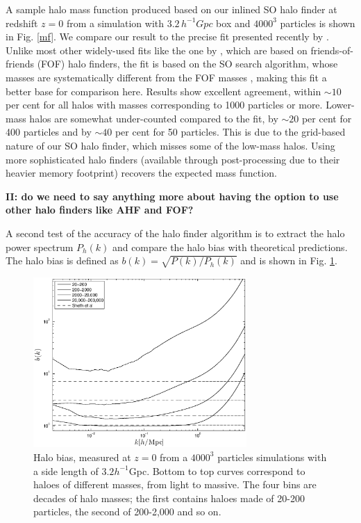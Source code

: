 A sample halo mass function produced based on our inlined SO halo finder 
at redshift $z=0$ from a simulation with $3.2\,h^{-1}Gpc$ box and $4000^3$
particles is shown in Fig. \ref{mf}. We compare our result to the 
precise fit presented recently by \citet{2008ApJ...688..709T}. Unlike most
other widely-used fits like the one by \citet{2002MNRAS.329...61S}, which are based on friends-of-friends (FOF)
halo finders, the \citet{2008ApJ...688..709T} fit is based on the
SO search algorithm, whose masses are systematically different 
from the FOF masses \citep[e.g.][]{2007MNRAS.374....2R,2008ApJ...688..709T}, 
making this fit a better base for comparison here. Results show excellent
agreement, within $\sim10$ per cent for all halos with masses corresponding to
1000 particles or more. Lower-mass halos are somewhat under-counted compared
to the \citet{2008ApJ...688..709T} fit, by $\sim20$ per cent for 400 particles and 
by $\sim40$ per cent for 50 particles. This is due to the grid-based nature of our
SO halo finder, which misses some of the low-mass halos. Using more sophisticated
halo finders (available through post-processing due to their heavier memory
footprint) recovers the expected mass function.



{\bf II: do we need to say anything more about having the option to use other
halo finders like AHF and FOF?}

A second test of the accuracy of the halo finder algorithm is to extract the halo power spectrum $P_{h}(k)$ and compare the halo bias
with theoretical predictions. The halo bias is defined as $b(k) = \sqrt{P(k)/P_{h}(k)}$ and is shown in Fig. \ref{fig:halo}.

\begin{figure}%
  \begin{center}
    \includegraphics[width=3.2in]{graphs/bias.eps}
  \end{center}
  \caption{Halo bias, measured at $z=0$ from a $4000^3$ particles simulations with a side length of $3.2 h^{-1}$Gpc.
  Bottom to top curves correspond to haloes of different masses, from light to massive. The four bins are decades
  of halo masses; the first contains haloes made of 20-200 particles, the second of 200-2,000 and so on.
    \label{fig:halo}}
\end{figure}


